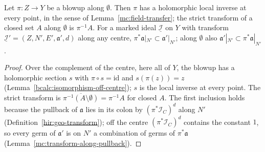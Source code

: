 \begin{lemma}
\label{mc:empty-blowup-inverse}
\leanok
Let \(\pi\colon Z\to Y\) be a blowup along \(\emptyset\). Then \(\pi\) has a holomorphic local inverse at every point, in the sense of
Lemma~\ref{mc:field-transfer}; the strict transform of a closed set \(A\) along \(\emptyset\) is \(\pi^{-1}A\). For a marked ideal \(\underline{\mathcal I}\) on \(Y\) with
transform \(\underline{\mathcal I}'=(Z,N',E',\mathfrak a',d)\) along any centre, \(\pi^*\mathfrak a|_{N'}\subset\mathfrak a'|_{N'}\); along \(\emptyset\) also
\(\mathfrak a'|_{N'}\subset\pi^*\mathfrak a|_{N'}\).
\end{lemma}
\begin{proof}
\leanok
Over the complement of the centre, here all of \(Y\), the blowup has a holomorphic section \(s\) with \(\pi\circ s=\mathrm{id}\) and \(s(\pi(z))=z\)
(Lemma~\ref{bcalc:isomorphism-off-centre}); \(s\) is the local inverse at every point. The strict transform is \(\overline{\pi^{-1}(A\setminus\emptyset)}=\pi^{-1}A\) for closed \(A\). The first inclusion holds because the
pullback of \(\mathfrak a\) lies in its colon by \((\pi^*\mathcal I_C)^d\) along \(N'\) (Definition~\ref{hir:geo-transform}); off the centre \((\pi^*\mathcal I_C)^d\) contains the
constant \(1\), so every germ of \(\mathfrak a'\) is on \(N'\) a combination of germs of \(\pi^*\mathfrak a\) (Lemma~\ref{mc:transform-along-pullback}).
\end{proof}

